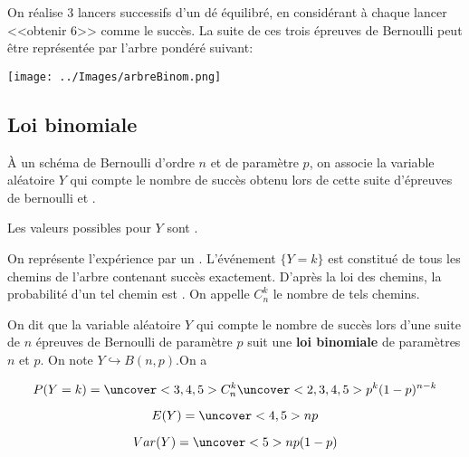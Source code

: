 \documentclass{beamer}
\begin{document}
 \begin{frame}
   \begin{example}
 On réalise $3$ lancers successifs d'un dé équilibré, en considérant à chaque lancer <<obtenir 6>>
 comme le succès. La suite de ces trois épreuves de Bernoulli peut être représentée par l'arbre pondéré
 suivant:
 
  \texttt{[image: ../Images/arbreBinom.png]}
 
  
 \end{example}
 \end{frame}

 \subsection{Loi binomiale}

 \begin{frame}
  
  \begin{definition}
  \`A un schéma de Bernoulli d'ordre $n$ et de paramètre $p$, on associe la variable aléatoire $Y$
  qui compte le nombre de succès obtenu lors de cette suite d'épreuves de bernoulli 
   et . 
  
  Les valeurs possibles pour $Y$ sont .
 \end{definition}
  On représente l'expérience par un . L'événement $\lbrace Y=k \rbrace$ est constitué 
  de tous les chemins de l'arbre contenant  succès exactement. D'après la loi des chemins, la probabilité
  d'un tel chemin est . On appelle $C_n^k$ le nombre de tels chemins.

 \end{frame}

 \begin{frame}
  \begin{theorem}
   On dit que la variable aléatoire $Y$ qui compte le nombre de succès lors d'une suite de $n$ épreuves
   de Bernoulli de paramètre $p$ suit une \textbf{loi binomiale} de paramètres $n$ et $p$. On note 
   $Y \hookrightarrow B(n,p)$.On a 
   
   $$P(Y=k)=\uncover<3,4,5>{C_n^k} \uncover<2,3,4,5>{p^k (1-p)^{n-k}}$$
   
   $$E(Y)=\uncover<4,5>{np}$$
   
   $$Var(Y)=\uncover<5>{np(1-p)}$$
   
  \end{theorem}
\end{frame}
\end{document}
